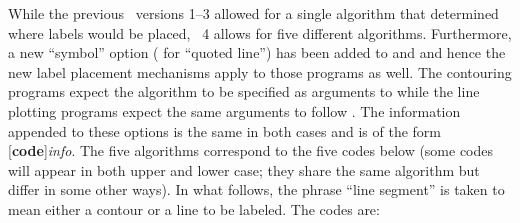 While the previous \GMT\ versions 1--3 allowed for a single algorithm that
determined where labels would be placed, \GMT\ 4 allows for five different
algorithms.  Furthermore, a new ``symbol'' option ( for ``quoted line'')
has been added to  and  and hence the new label
placement mechanisms apply to those programs as well.  The contouring programs
expect the algorithm to be specified as arguments to  while the line plotting
programs expect the same arguments to follow .  The information appended
to these options is the same in both cases and is of the form [\textbf{code}]\emph{info}.
The five algorithms correspond to the five codes below (some codes will appear in both
upper and lower case; they share the same algorithm but differ in some other ways).
In what follows, the phrase ``line segment'' is taken to mean either a contour or a line
to be labeled.  The codes are:
